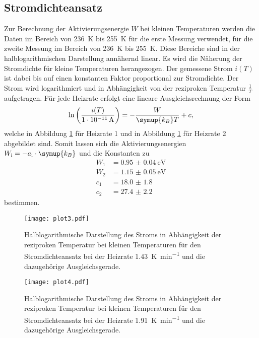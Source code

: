 \subsection{Stromdichteansatz}
\label{sec:klT}
Zur Berechnung der Aktivierungsenergie $W$ bei kleinen Temperaturen werden die Daten im Bereich von \SI{236}{\kelvin} bis \SI{255}{\kelvin} für die erste Messung verwendet, für die zweite Messung im Bereich von \SI{236}{\kelvin} bis \SI{255}{\kelvin}.
Diese Bereiche sind in der halblogarithmischen Darstellung annähernd linear.
Es wird die Näherung der Stromdichte für kleine Temperaturen herangezogen.
Der gemessene Strom $i(T)$ ist dabei bis auf einen konstanten Faktor proportional zur Stromdichte.
Der Strom wird logarithmiert und in Abhängigkeit von der reziproken Temperatur $\frac{1}{T}$ aufgetragen.
Für jede Heizrate erfolgt eine lineare Ausgleichsrechnung der Form
\begin{equation}
    \label{eqn:lin}
    \ln\left(\frac{i(T)}{\SI{1e-11}{\ampere}}\right) = -\frac{W}{\symup{k_B} T} + c,
\end{equation}
welche in Abbildung \ref{fig:plot3} für Heizrate 1 und in Abbildung \ref{fig:plot3} für Heizrate 2 abgebildet sind.
Somit lassen sich die Aktivierungsenergien $W_\text{i} = -a_\text{i} \cdot \symup{k_B}$ und die Konstanten zu
\begin{align*}
    W_1 &= \SI{0.95(4)}{\electronvolt} \\
    W_2 &= \SI{1.15(5)}{\electronvolt} \\
    c_1 &= \num{18.0(18)} \\
    c_2 &= \num{27.4(22)}
\end{align*}
bestimmen.

\begin{figure}
  \centering
  \texttt{[image: plot3.pdf]}
  \caption{Halblogarithmische Darstellung des Stroms in Abhängigkeit der reziproken Temperatur bei kleinen Temperaturen für den Stromdichteansatz bei der Heizrate \SI{1.43}{\kelvin\per\minute} und die dazugehörige Ausgleichsgerade.}
  \label{fig:plot3}
\end{figure}
\begin{figure}
  \centering
  \texttt{[image: plot4.pdf]}
  \caption{Halblogarithmische Darstellung des Stroms in Abhängigkeit der reziproken Temperatur bei kleinen Temperaturen für den Stromdichteansatz bei der Heizrate \SI{1.91}{\kelvin\per\minute} und die dazugehörige Ausgleichsgerade.}
  \label{fig:plot4}
\end{figure}

